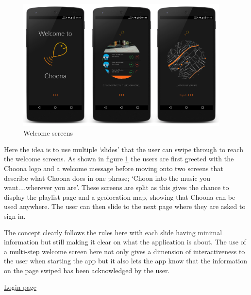 \noindent
\begin{figure}[h!]
\centering
\includegraphics[width=0.95\textwidth]{./img/welcomeframed.png}
\caption{Welcome screens}
\label{fig:welcomescreens}
\end{figure}

Here the idea is to use multiple `slides' that the user can swipe through to reach the welcome screens. As shown in figure \ref{fig:welcomescreens} the users are first greeted with the Choona logo and a welcome message before moving onto two screens that describe what Choona does in one phrase; `Choon into the music you want....wherever you are'. These screens are split as this gives the chance to display the playlist page and a geolocation map, showing that Choona can be used anywhere. The user can then slide to the next page where they are asked to sign in. 

The concept clearly follows the rules here with each slide having minimal information but still making it clear on what the application is about. The use of a multi-step welcome screen here not only gives a dimension of interactiveness to the user when starting the app but it also lets the app know that the information on the page swiped has been acknowledged by the user.  

\clearpage

\noindent\underline{Login page}\newline


